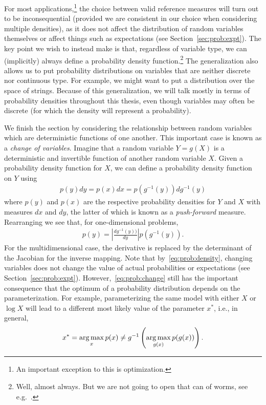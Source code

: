 For most applications,\footnote{An important
	exception to this is optimization.}
the choice between valid reference measures will turn out to be
inconsequential (provided we are consistent in our choice when considering multiple
densities), as it does not affect the distribution of random variables themselves 
or affect things such as expectations (see Section~\ref{sec:prob:expt}).  
The key point we wish to instead make is that, regardless of variable type, we can
(implicitly) always define a probability density function.\footnote{Well, almost always.  But we
	are not going to open that can of worms, see e.g.~\cite{durrett2010probability}.}  
The generalization also allows us
to put probability distributions on variables that are neither discrete nor continuous type.
For example, we might want to put a distribution over the space of strings.  
Because of this generalization, we will talk mostly in terms of probability densities throughout
this thesis, even though variables may often be discrete (for which the density will 
represent a probability).

We finish the section by considering the relationship between random variables which
are deterministic functions of one another.  This important case is known as a
\emph{change of variables}.  Imagine
that a random variable $Y=g(X)$ is a deterministic and invertible function of another random variable $X$.
Given a probability density function for $X$, we can define a probability density function
on $Y$ using
\begin{align}
\label{eq:prob:change}
p(y)dy = p(x)dx = p(g^{-1}(y))dg^{-1}(y)
\end{align} 
where $p(y)$ and $p(x)$ are the respective probability densities for $Y$ and $X$
with measures $dx$ and $dy$,  the latter of which is known as a \emph{push-forward} measure.
Rearranging we see that, for one-dimensional problems, 
\begin{align}
\label{eq:prob:change2}
p(y) = \left|\frac{dg^{-1}(y))}{dy}\right|p(g^{-1}(y)).
\end{align}
For the multidimensional case, the derivative is replaced by the determinant of the
Jacobian for the inverse mapping.  Note that by~\eqref{eq:prob:density}, changing
variables does not change the value of actual probabilities or expectations (see
 Section~\ref{sec:prob:expt}).  However,~\eqref{eq:prob:change}
still has the important consequence that the optimum of a probability distribution
depends on the parameterization.  For example, parameterizing the same model with
either $X$ or $\log X$ will lead to a different most likely value of the parameter
$x^*$, i.e., in general,
\begin{align}
x^* = \operatorname*{arg\,max}_{x} p(x) \neq g^{-1} \left(\operatorname*{arg\,max}_{g(x)} p(g(x))\right).
\end{align}


